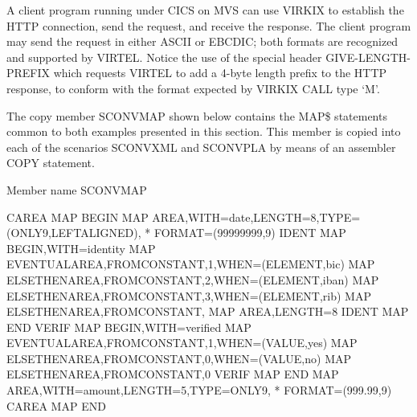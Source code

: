 \documentclass[letterpaper,10pt,english]{sphinxmanual}
\begin{document}

A client program running under CICS on MVS can use VIRKIX to establish the HTTP connection, send the request, and
receive the response. The client program may send the request in either ASCII or EBCDIC; both formats are recognized
and supported by VIRTEL. Notice the use of the special header GIVE-LENGTH-PREFIX which requests VIRTEL to add a
4-byte length prefix to the HTTP response, to conform with the format expected by VIRKIX CALL type ‘M’.


The copy member SCONVMAP shown below contains the MAP\$ statements common to both examples presented in
this section. This member is copied into each of the scenarios SCONVXML and SCONVPLA by means of an assembler
COPY statement.

\begin{sphinxVerbatim}[commandchars=\\\{\}]
Member name SCONVMAP

CAREA       MAP\PYGZdl{} BEGIN
            MAP\PYGZdl{} AREA,WITH=\PYGZsq{}date\PYGZsq{},LENGTH=8,TYPE=(ONLY9,LEFT\PYGZhy{}ALIGNED),     *
                FORMAT=(\PYGZsq{}9999\PYGZhy{}99\PYGZhy{}99\PYGZsq{},9)
IDENT       MAP\PYGZdl{} BEGIN,WITH=\PYGZsq{}identity\PYGZsq{}
            MAP\PYGZdl{} EVENTUAL\PYGZhy{}AREA,FROM\PYGZhy{}CONSTANT,\PYGZsq{}1\PYGZsq{},WHEN=(ELEMENT,\PYGZsq{}bic\PYGZsq{})
            MAP\PYGZdl{} ELSETHEN\PYGZhy{}AREA,FROM\PYGZhy{}CONSTANT,\PYGZsq{}2\PYGZsq{},WHEN=(ELEMENT,\PYGZsq{}iban\PYGZsq{})
            MAP\PYGZdl{} ELSETHEN\PYGZhy{}AREA,FROM\PYGZhy{}CONSTANT,\PYGZsq{}3\PYGZsq{},WHEN=(ELEMENT,\PYGZsq{}rib\PYGZsq{})
            MAP\PYGZdl{} ELSETHEN\PYGZhy{}AREA,FROM\PYGZhy{}CONSTANT,\PYGZsq{} \PYGZsq{}
            MAP\PYGZdl{} AREA,LENGTH=8
IDENT       MAP\PYGZdl{} END
VERIF       MAP\PYGZdl{} BEGIN,WITH=\PYGZsq{}verified\PYGZsq{}
            MAP\PYGZdl{} EVENTUAL\PYGZhy{}AREA,FROM\PYGZhy{}CONSTANT,\PYGZsq{}1\PYGZsq{},WHEN=(VALUE,\PYGZsq{}yes\PYGZsq{})
            MAP\PYGZdl{} ELSETHEN\PYGZhy{}AREA,FROM\PYGZhy{}CONSTANT,\PYGZsq{}0\PYGZsq{},WHEN=(VALUE,\PYGZsq{}no\PYGZsq{})
            MAP\PYGZdl{} ELSETHEN\PYGZhy{}AREA,FROM\PYGZhy{}CONSTANT,\PYGZsq{}0\PYGZsq{}
VERIF       MAP\PYGZdl{} END
            MAP\PYGZdl{} AREA,WITH=\PYGZsq{}amount\PYGZsq{},LENGTH=5,TYPE=ONLY9,                  *
                FORMAT=(\PYGZsq{}\PYGZdl{}999.99\PYGZsq{},9)
CAREA MAP\PYGZdl{} END
\end{sphinxVerbatim}
\end{document}
